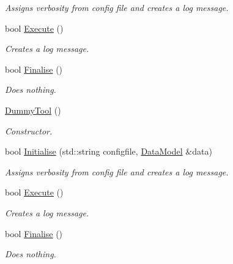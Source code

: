\begin{DoxyCompactItemize}
\begin{DoxyCompactList}\small\item\em Assigns verbosity from config file and creates a log message. \end{DoxyCompactList}\item 
\hypertarget{classDummyTool_ac107b31f1785c1cc803e0e65be548047}{bool \hyperlink{classDummyTool_ac107b31f1785c1cc803e0e65be548047}{Execute} ()}\label{classDummyTool_ac107b31f1785c1cc803e0e65be548047}

\begin{DoxyCompactList}\small\item\em Creates a log message. \end{DoxyCompactList}\item 
\hypertarget{classDummyTool_aacb5d0b9906a27c2b4bba4aae9bc093a}{bool \hyperlink{classDummyTool_aacb5d0b9906a27c2b4bba4aae9bc093a}{Finalise} ()}\label{classDummyTool_aacb5d0b9906a27c2b4bba4aae9bc093a}

\begin{DoxyCompactList}\small\item\em Does nothing. \end{DoxyCompactList}\item 
\hypertarget{classDummyTool_a33914471b4de346168aa92b5febb6f9c}{\hyperlink{classDummyTool_a33914471b4de346168aa92b5febb6f9c}{Dummy\-Tool} ()}\label{classDummyTool_a33914471b4de346168aa92b5febb6f9c}

\begin{DoxyCompactList}\small\item\em Constructor. \end{DoxyCompactList}\item 
\hypertarget{classDummyTool_a0d9cd781681a06ee3cf0cd1e7bb770a8}{bool \hyperlink{classDummyTool_a0d9cd781681a06ee3cf0cd1e7bb770a8}{Initialise} (std\-::string configfile, \hyperlink{classDataModel}{Data\-Model} \&data)}\label{classDummyTool_a0d9cd781681a06ee3cf0cd1e7bb770a8}

\begin{DoxyCompactList}\small\item\em Assigns verbosity from config file and creates a log message. \end{DoxyCompactList}\item 
\hypertarget{classDummyTool_ac107b31f1785c1cc803e0e65be548047}{bool \hyperlink{classDummyTool_ac107b31f1785c1cc803e0e65be548047}{Execute} ()}\label{classDummyTool_ac107b31f1785c1cc803e0e65be548047}

\begin{DoxyCompactList}\small\item\em Creates a log message. \end{DoxyCompactList}\item 
\hypertarget{classDummyTool_aacb5d0b9906a27c2b4bba4aae9bc093a}{bool \hyperlink{classDummyTool_aacb5d0b9906a27c2b4bba4aae9bc093a}{Finalise} ()}\label{classDummyTool_aacb5d0b9906a27c2b4bba4aae9bc093a}

\begin{DoxyCompactList}\small\item\em Does nothing. \end{DoxyCompactList}\end{DoxyCompactItemize}
